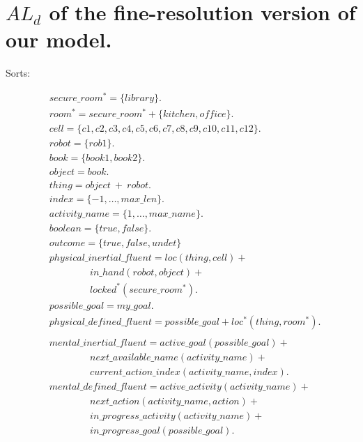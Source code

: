 \documentclass[11pt, oneside]{article}
\begin{document}
\section{$AL_d$ of the fine-resolution version of our model.}

Sorts:
\begin{allowdisplaybreaks}
\begin{align*}
  &secure\_room^* = \{library\}.\\
  &room^* = secure\_room^* +\{kitchen, office\}.\\
    &cell = \{c1, c2, c3, c4, c5, c6, c7, c8, c9, c10, c11, c12\}.\\
  &robot = \{rob1\}.\\
  &book = \{book1, book2\}.\\
  &object = book.\\
  &thing = object\ +\ robot.\\
  &index = \{-1,\dots ,max\_len\}.\\
  &activity\_name = \{1, \dots, max\_name\}.\\
  &boolean = \{true, false\}.\\
  &outcome = \{true, false, undet\}
  \\
  &physical\_inertial\_fluent =  loc(thing, cell) +\\
  &\hspace{50pt} in\_hand(robot,object) +\\
  &\hspace{50pt} locked^*(secure\_room^*). \\
  &possible\_goal = my\_goal.\\
  &physical\_defined\_fluent = possible\_goal + {loc^*(thing, room^*)}.\\
  \\
  &mental\_inertial\_fluent =  active\_goal(possible\_goal) +\\
&\hspace{50pt} next\_available\_name(activity\_name) +\\
&\hspace{50pt} current\_action\_index(activity\_name, index).\\
&mental\_defined\_fluent = active\_activity(activity\_name)+\\
&\hspace{50pt} next\_action(activity\_name, action)+\\
&\hspace{50pt} in\_progress\_activity(activity\_name)+\\
&\hspace{50pt} in\_progress\_goal(possible\_goal).\\

\end{align*}
\end{allowdisplaybreaks}
\end{document}
